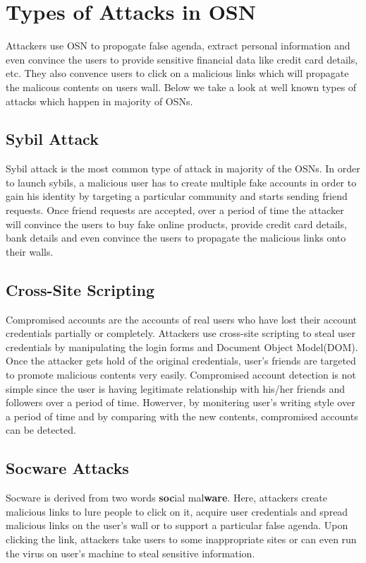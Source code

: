 \documentclass[conference]{IEEEtran}
\begin{document}
\section{Types of Attacks in OSN}
Attackers use OSN to propogate false agenda, extract personal information and even convince the users to provide sensitive financial data like credit card details, etc. They also convence users to click on a malicious links which will propagate the malicous contents on users wall. Below we take a look at well known types of attacks which happen in majority of OSNs.

\subsection{Sybil Attack}
Sybil attack is the most common type of attack in majority of the OSNs. In order to launch sybils, a malicious user has to create multiple fake accounts in order to gain his identity by targeting a particular community and starts sending friend requests. Once friend requests are accepted, over a period of time the attacker will convince the users to buy fake online products, provide credit card details, bank details and even convince the users to propagate the malicious links onto their walls.

\subsection{Cross-Site Scripting}
Compromised accounts are the accounts of real users who have lost their account credentials partially or completely. Attackers use cross-site scripting to steal user credentials by manipulating the login forms and Document Object Model(DOM). Once the attacker gets hold of the original credentials, user's friends are targeted to promote malicious contents very easily. Compromised account detection is not simple since the user is having legitimate relationship with his/her friends and followers over a period of time. Howerver, by monitering user's writing style over a period of time and by comparing with the new contents, compromised accounts can be detected.

\subsection{Socware Attacks}
Socware is derived from two words \textbf{soc}ial mal\textbf{ware}. Here, attackers create malicious links to lure people to click on it, acquire user credentials and spread malicious links on the user's wall or to support a particular false agenda. Upon clicking the link, attackers take users to some inappropriate sites or can even run the virus on user's machine to steal sensitive information.
\end{document}
